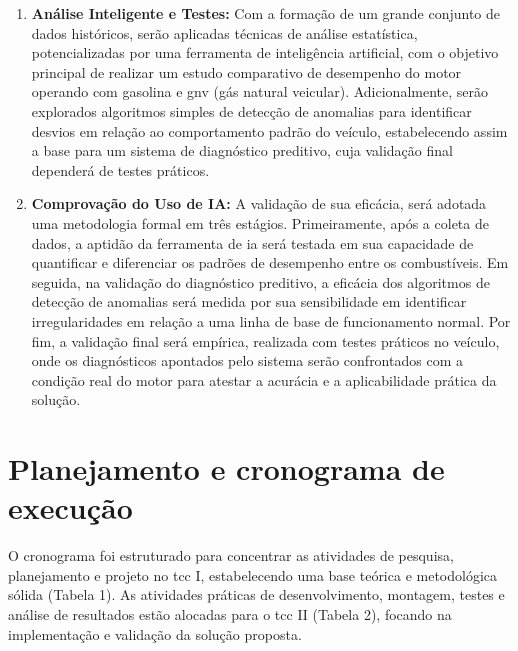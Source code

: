 \documentclass[a4paper, 12pt]{article}
\begin{document}
\begin{enumerate}
\item \textbf{Análise Inteligente e Testes:} Com a formação de um grande conjunto de dados históricos, serão aplicadas técnicas de análise estatística, potencializadas por uma ferramenta de inteligência artificial, com o objetivo principal de realizar um estudo comparativo de desempenho do motor operando com gasolina e \acrshort{gnv} (gás natural veicular). Adicionalmente, serão explorados algoritmos simples de detecção de anomalias para identificar desvios em relação ao comportamento padrão do veículo, estabelecendo assim a base para um sistema de diagnóstico preditivo, cuja validação final dependerá de testes práticos.

\item \textbf{Comprovação do Uso de IA:} A validação de sua eficácia, será adotada uma metodologia formal em três estágios. Primeiramente, após a coleta de dados, a aptidão da ferramenta de \acrshort{ia} será testada em sua capacidade de quantificar e diferenciar os padrões de desempenho entre os combustíveis. Em seguida, na validação do diagnóstico preditivo, a eficácia dos algoritmos de detecção de anomalias será medida por sua sensibilidade em identificar irregularidades em relação a uma linha de base de funcionamento normal. Por fim, a validação final será empírica, realizada com testes práticos no veículo, onde os diagnósticos apontados pelo sistema serão confrontados com a condição real do motor para atestar a acurácia e a aplicabilidade prática da solução.
\end{enumerate}

\clearpage

\section{Planejamento e cronograma de execução}
O cronograma foi estruturado para concentrar as atividades de pesquisa, planejamento e projeto no \acrshort{tcc} I, estabelecendo uma base teórica e metodológica sólida (Tabela 1). As atividades práticas de desenvolvimento, montagem, testes e análise de resultados estão alocadas para o \acrshort{tcc} II (Tabela 2), focando na implementação e validação da solução proposta.
\end{document}
